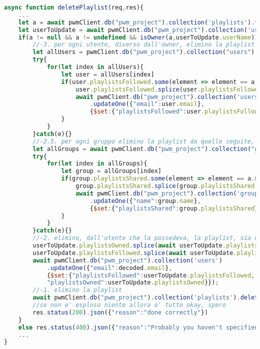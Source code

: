\begin{lstlisting}[language=Javascript]
async function deletePlaylist(req,res){
    ...
    let a = await pwmClient.db("pwm_project").collection('playlists').findOne({"name": validator.escape(req.params.name)})
    let userToUpdate = await pwmClient.db("pwm_project").collection('users').findOne({"email":decoded.email});
    if(a != null && a != undefined && isOwner(a,userToUpdate.userName)){
        //-3. per ogni utente, diverso dall'owner, elimino la playlist da quelle seguite, laddove presente.
        let allUsers = pwmClient.db("pwm_project").collection("users").find({"email":{$ne: decoded.email}}).toArray()
        try{
            for(let index in allUsers){
                let user = allUsers[index]
                if(user.playlistsFollowed.some(element => element == a.name)){
                    user.playlistsFollowed.splice(user.playlistsFollowed.indexOf(a.name),1)
                    await pwmClient.db("pwm_project").collection('users')
                        .updateOne({"email":user.email},
                        {$set:{"playlistsFollowed":user.playlistsFollowed}})
                }
            }
        }catch(e){}
        //-2.5. per ogni gruppo elimino la playlist da quelle seguite, laddove presente
        let allGroups = await pwmClient.db("pwm_project").collection("groups").find({}).toArray()
        try{
            for(let index in allGroups){
                let group = allGroups[index]
                if(group.playlistsShared.some(element => element == a.name)){
                    group.playlistsShared.splice(group.playlistsShared.indexOf(a.name),1)
                    await pwmClient.db("pwm_project").collection('groups')
                        .updateOne({"name":group.name},
                        {$set:{"playlistsShared":group.playlistsShared}})
                }
            }
        }catch(e){}
        //-2. elimino, dall'utente che la possedeva, la playlist, sia da quelle seguite che da quelle totali (aka assicuro integrita' referenziale)
        userToUpdate.playlistsOwned.splice(await userToUpdate.playlistsOwned.indexOf(a.name),1)
        userToUpdate.playlistsFollowed.splice(await userToUpdate.playlistsFollowed.indexOf(a.name),1)
        await pwmClient.db("pwm_project").collection('users')
            .updateOne({"email":decoded.email},
            {$set:{"playlistsFollowed":userToUpdate.playlistsFollowed,
            "playlistsOwned":userToUpdate.playlistsOwned}});
        //-1. elimino la playlist
        await pwmClient.db("pwm_project").collection('playlists').deleteOne(a)
        //se non e' esploso niente allora e' tutto okay, spero
        res.status(200).json({"reason":"done correctly"})
    }
    else res.status(400).json({"reason":"Probably you haven't specified the right params"})
    ...
}
\end{lstlisting}
